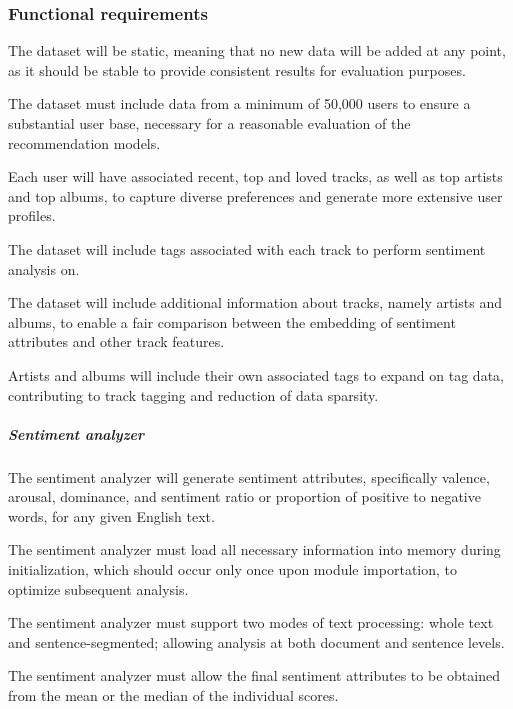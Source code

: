 \subsubsection{Functional requirements}
\begin{functionalmod}[DS]
    \item The dataset will be static, meaning that no new data will be added at any point, as it should be stable to provide consistent results for evaluation purposes.
    \item The dataset must include data from a minimum of 50,000 users to ensure a substantial user base, necessary for a reasonable evaluation of the recommendation models.
    \begin{functionalmod}[DS]
        \item Each user will have associated recent, top and loved tracks, as well as top artists and top albums, to capture diverse preferences and generate more extensive user profiles.
    \end{functionalmod}
    \item The dataset will include tags associated with each track to perform sentiment analysis on.
    \item The dataset will include additional information about tracks, namely artists and albums, to enable a fair comparison between the embedding of sentiment attributes and other track features.
    \begin{functionalmod}[DS]
        \item Artists and albums will include their own associated tags to expand on tag data, contributing to track tagging and reduction of data sparsity.
    \end{functionalmod}
    \setcounter{DSF}{\value{enumi}}
\end{functionalmod}
\subparagraph{Sentiment analyzer}
\begin{functionalmod}[DS]
    \setcounter{enumi}{\value{DSF}}
    \item The sentiment analyzer will generate sentiment attributes, specifically valence, arousal, dominance, and sentiment ratio or proportion of positive to negative words, for any given English text.
    \item The sentiment analyzer must load all necessary information into memory during initialization, which should occur only once upon module importation, to optimize subsequent analysis.
    \item The sentiment analyzer must support two modes of text processing: whole text and sentence-segmented; allowing analysis at both document and sentence levels.
    \item The sentiment analyzer must allow the final sentiment attributes to be obtained from the mean or the median of the individual scores.
\end{functionalmod}

